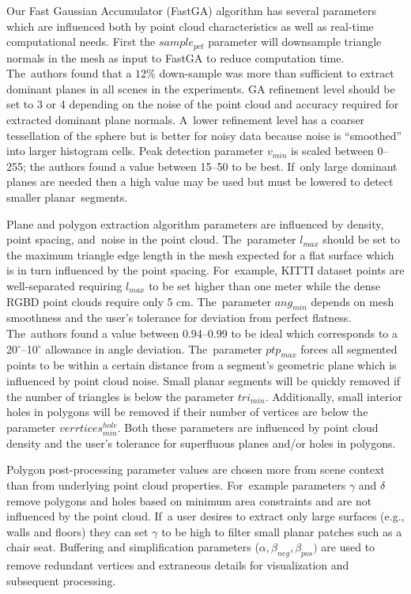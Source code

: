 Our Fast Gaussian Accumulator (FastGA) algorithm has several parameters which are influenced both by point cloud characteristics as well as real-time computational needs. First the $sample_{pct}$ parameter will downsample triangle normals in the mesh as input to FastGA to reduce computation time. The~authors found that a $12 \%$ down-sample was more than sufficient to extract dominant planes in all scenes in the experiments. GA refinement level should be set to 3 or 4 depending on the noise of the point cloud and accuracy required for extracted dominant plane normals. A~lower refinement level has a coarser tessellation of the sphere but is better for noisy data because noise is ``smoothed'' into larger histogram cells. Peak detection parameter $v_{min}$ is scaled between 0--255; the authors found a value between 15--50 to be best. If~only large dominant planes are needed then a high value may be used but must be lowered to detect smaller planar~segments.

Plane and polygon extraction algorithm parameters are influenced by  density, point spacing, and~noise in the point cloud. The~parameter $l_{max}$ should be set to the maximum triangle edge length in the mesh expected for a flat surface which is in turn influenced by the point spacing. For~example, KITTI dataset points are well-separated requiring $l_{max}$ to be set higher than one meter while the dense RGBD point clouds require only 5 cm. The~parameter $ang_{min}$ depends on mesh smoothness and the user's tolerance for deviation from perfect flatness. The~authors found a value between 0.94--0.99 to be ideal which corresponds to a 20$^{\circ}$--10$^{\circ}$ allowance in angle deviation. The~parameter $ptp_{max}$ forces all segmented points to be within a certain distance from a segment's geometric plane which is influenced by point cloud noise. Small planar segments will be quickly removed if the number of triangles is below the parameter $tri_{min}$. Additionally, small interior holes in polygons will be removed if their number of vertices are below the parameter $verrtices^{hole}_{min}$. Both these parameters are influenced by point cloud density and the user's tolerance for superfluous planes and/or holes in polygons.

Polygon post-processing parameter values are chosen more from scene context than from underlying point cloud properties. For~example parameters $\gamma$ and $\delta$ remove polygons and holes based on minimum area constraints and are not influenced by the point cloud. If~a user desires to extract only large surfaces (e.g., walls and floors) they can set $\gamma$ to be high to filter small planar patches such as a chair seat. Buffering and simplification parameters ($\alpha, \beta_{neg}, \beta_{pos})$ are used to remove redundant vertices and extraneous details for visualization and subsequent processing.%

